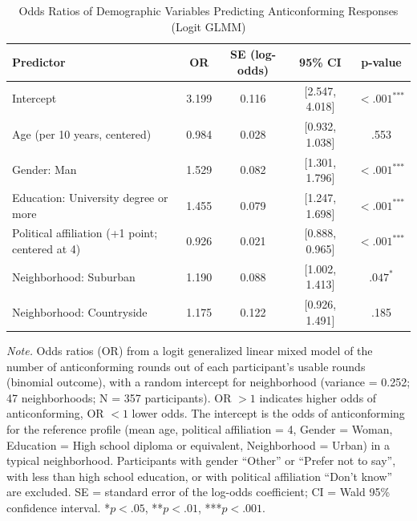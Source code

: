 \begin{table}[H]
\centering
\caption{Odds Ratios of Demographic Variables Predicting Anticonforming Responses (Logit GLMM)}
\label{tab:or_antic_demog}
\begingroup
\footnotesize
\renewcommand{\arraystretch}{0.90}

\begin{tabularx}{\linewidth}{Xcccc}
\toprule
\textbf{Predictor} & \textbf{OR} & \textbf{SE (log-odds)} & \textbf{95\% CI} & \textbf{p-value} \\
\midrule
Intercept & 3.199 & 0.116 & [2.547, 4.018] & $< .001^{\text{***}}$ \\
Age (per 10 years, centered) & 0.984 & 0.028 & [0.932, 1.038] & .553 \\
Gender: Man & 1.529 & 0.082 & [1.301, 1.796] & $< .001^{\text{***}}$ \\
Education: University degree or more & 1.455 & 0.079 & [1.247, 1.698] & $< .001^{\text{***}}$ \\
Political affiliation (+1 point; centered at 4) & 0.926 & 0.021 & [0.888, 0.965] & $< .001^{\text{***}}$ \\
Neighborhood: Suburban & 1.190 & 0.088 & [1.002, 1.413] & $.047^{\text{*}}$ \\
Neighborhood: Countryside & 1.175 & 0.122 & [0.926, 1.491] & .185 \\
\bottomrule
\end{tabularx}

\vspace{0.6em}
{\footnotesize
\setlength{\baselineskip}{12pt}
\textit{Note.} Odds ratios (OR) from a logit generalized linear mixed model of the number of anticonforming rounds out of each participant's usable rounds (binomial outcome), with a random intercept for neighborhood (variance = 0.252; 47 neighborhoods; N = 357 participants). OR $> 1$ indicates higher odds of anticonforming, OR $< 1$ lower odds. The intercept is the odds of anticonforming for the reference profile (mean age, political affiliation = 4, Gender = Woman, Education = High school diploma or equivalent, Neighborhood = Urban) in a typical neighborhood. Participants with gender ``Other'' or ``Prefer not to say'', with less than high school education, or with political affiliation ``Don't know'' are excluded. SE = standard error of the log-odds coefficient; CI = Wald 95\% confidence interval. *$p < .05$, **$p < .01$, ***$p < .001$.
\par}
\endgroup
\end{table}
